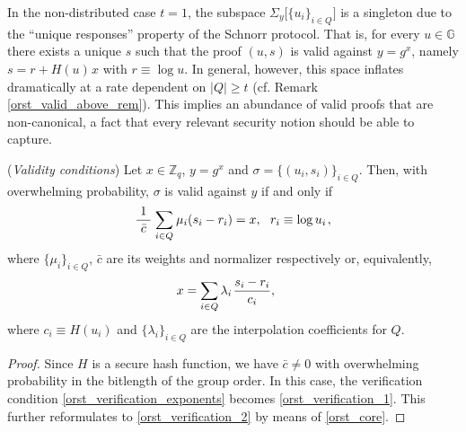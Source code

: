 \documentclass{iacrtrans}
\begin{document}
\begin{rem}
In the non-distributed case $t=1$, the subspace
$\Sigma_y \big[\{u_i\}_{i \in Q}\big]$
is a singleton due to the ``unique responses'' property
of the Schnorr protocol.
That is, for every $u \in \mathbb{G}$
there exists a unique $s$
such that the proof $(u, s)$ is valid against $y=g^x$,
namely $s = r + H(u)\hspace{1pt}x$ with $r \equiv \log u$.
In general, however,
this space inflates dramatically
at a rate dependent on $|Q| \ge t$
(cf. Remark \ref{orst_valid_above_rem}).
This implies an abundance of valid proofs that
are non-canonical, a fact that
every relevant security notion should be able to capture.
\end{rem}

\begin{prop}\label{orst_validity_conditions}
\textup{(\textit{Validity conditions})}
Let $x \in \mathbb{Z}_q$, $y = g ^ x$ and
$\sigma = \{(u_i, s_i)\}_{i \in Q}$.
Then, with overwhelming probability,
$\sigma$ is valid against $y$
if and only if
\vspace{5pt}
\begin{equation}\label{orst_verification_1}
\frac{1}{\ \bar{c}\ }
\hspace{1pt}
\sum_{i \in Q}
	\hspace{0.5pt} \mu_i (s_i - r_i)
=
x,
\ \ r_i \equiv \log u_i\hspace{1pt},
\vspace{5pt}
\end{equation}
where $\{\mu_i\}_{i \in Q}$, $\bar{c}$
are its weights and normalizer respectively
or, equivalently,
\vspace{5pt}
\begin{equation}\label{orst_verification_2}
\hspace{-12pt}x
=
\sum_{i \in Q} \lambda_i\hspace{1pt}\frac{s_i - r_i}{c_i},
\vspace{5pt}
\end{equation}
where $c_i \equiv H(u_i)$
and $\{\lambda_i\}_{i \in Q}$ are the interpolation
coefficients for $Q$.
\end{prop}

\begin{proof}
Since $H$
is a secure hash function,
we have
$\bar{c} \neq 0$ with overwhelming probability
in the bitlength of the group order.
In this case,
the verification condition \eqref{orst_verification_exponents}
becomes \eqref{orst_verification_1}.
This further reformulates to
\eqref{orst_verification_2} by means of \eqref{orst_core}.
\vspace{5pt}
\end{proof}
\end{document}
